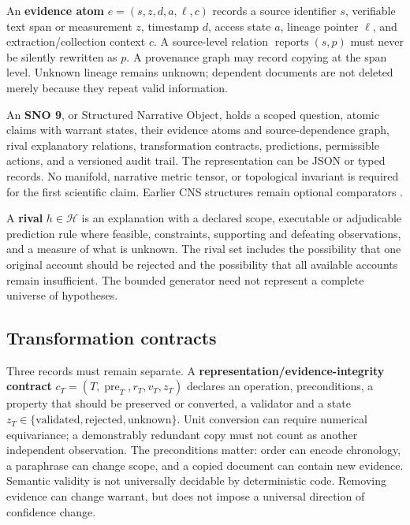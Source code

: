 \documentclass[11pt,a4paper]{article}
\begin{document}
An \textbf{evidence atom} \(e=(s,z,d,a,\ell,c)\) records a source
identifier \(s\), verifiable text span or measurement \(z\), timestamp
\(d\), access state \(a\), lineage pointer \(\ell\), and
extraction/collection context \(c\). A source-level relation
\(\operatorname{reports}(s,p)\) must never be silently rewritten as
\(p\). A provenance graph may record copying at the span level. Unknown
lineage remains unknown; dependent documents are not deleted merely
because they repeat valid information.

An \textbf{SNO 9}, or Structured Narrative Object, holds a scoped
question, atomic claims with warrant states, their evidence atoms and
source-dependence graph, rival explanatory relations, transformation
contracts, predictions, permissible actions, and a versioned audit
trail. The representation can be JSON or typed records. No manifold,
narrative metric tensor, or topological invariant is required for the
first scientific claim. Earlier CNS structures remain optional
comparators \citep{G02, G09}.

A \textbf{rival} \(h\in\mathcal{H}\) is an explanation with a declared
scope, executable or adjudicable prediction rule where feasible,
constraints, supporting and defeating observations, and a measure of
what is unknown. The rival set includes the possibility that one
original account should be rejected and the possibility that all
available accounts remain insufficient. The bounded generator need not
represent a complete universe of hypotheses.

\subsection{Transformation contracts}\label{transformation-contracts}

Three records must remain separate. A
\textbf{representation/evidence-integrity contract}
\(c_T=(T,\operatorname{pre}_T,r_T,v_T,z_T)\) declares an operation,
preconditions, a property that should be preserved or converted, a
validator and a state
\(z_T\in\{\text{validated},\text{rejected},\text{unknown}\}\). Unit
conversion can require numerical equivariance; a demonstrably redundant
copy must not count as another independent observation. The
preconditions matter: order can encode chronology, a paraphrase can
change scope, and a copied document can contain new evidence. Semantic
validity is not universally decidable by deterministic code. Removing
evidence can change warrant, but does not impose a universal direction
of confidence change.
\end{document}
